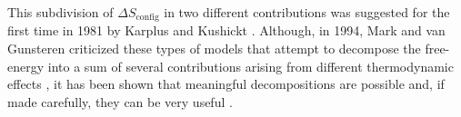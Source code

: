 This subdivision of $\Delta S_\text{config}$ in two different contributions was suggested for the first time in 1981 by Karplus and Kushickt \cite{karplus1981method}. Although, in 1994, Mark and van Gunsteren criticized these types of models that attempt to decompose the free-energy into a sum of several contributions arising from different thermodynamic effects \cite{mark1994decomposition}, it has been shown that meaningful decompositions are possible and, if made carefully, they can be very useful \cite{lazaridis2002thermodynamics}.




\vspace{0.45cm}

